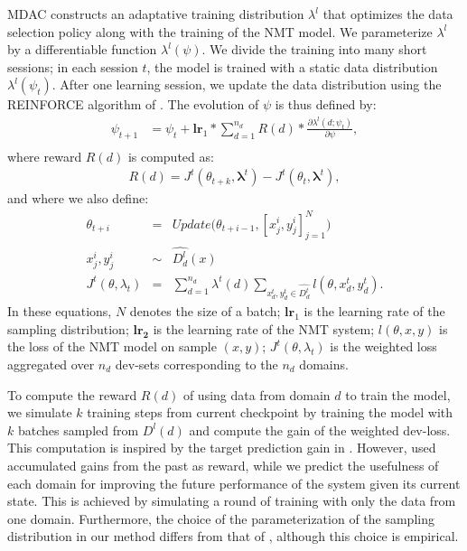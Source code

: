 \documentclass[11pt]{article}
\newcommand{\vlambda}{\ensuremath{\boldsymbol\lambda}\xspace} %
\begin{document}
MDAC constructs an adaptative training distribution $\lambda^{l}$ that optimizes the data selection policy along with the training of the NMT model. We parameterize $\lambda^{l}$ by a differentiable function $\lambda^l(\psi)$. We divide the training into many short sessions; in each session $t$, the model is trained with a static data distribution $\lambda^{l}(\psi_t)$. After one learning session, we update the data distribution using the REINFORCE algorithm of \citet{Williams92simple}. The evolution of $\psi$ is thus defined by:
\begin{align*}
\psi_{t+1} &= \psi_t + \mathbf{lr}_{1} * \displaystyle{\mathop{\sum}_{d=1}^{n_d}} R(d) * \frac{\partial \lambda^l(d;\psi_t)}{\partial \psi}, \\
\end{align*}
\begingroup
\allowdisplaybreaks
where reward $R(d)$ is computed as:
\begin{align*}
  R(d) = J^t(\theta_{t+k},\vlambda^t) - J^t(\theta_t,\vlambda^t),
\end{align*}
and where we also define:
\begin{equation}
\begin{array}{rcl}
\theta_{t+i} &=& Update\big(\theta_{t+i-1},[x^i_j,y^i_j]_{j=1}^N\big) \\ \nonumber
x^i_j, y^i_j &\sim& \widehat{D^l_d}(x) \\
J^t(\theta,\lambda_t) &=& \displaystyle{\mathop{\sum}_{d=1}^{n_d}}\lambda^t(d)\displaystyle{\mathop{\sum}_{x^t_d,y^t_d \in \widehat{D^t_d}}} l(\theta,x^t_d,y^t_d).
\end{array}
\end{equation}
\endgroup
In these equations, $N$ denotes the size of a batch; $\mathbf{lr}_{1}$ is the learning rate of the sampling distribution; $\mathbf{lr_2}$ is the learning rate of the NMT system; $l(\theta,x,y)$ is the loss of the NMT model on sample $(x,y)$; $J^t(\theta,\lambda_t)$ is the weighted loss aggregated over $n_d$ dev-sets corresponding to the $n_d$ domains.

To compute the reward $R(d)$ of using data from domain $d$ to train the model, we simulate $k$ training steps from current checkpoint by training the model with $k$ batches sampled from $D^l(d)$ and compute the gain of the weighted dev-loss. This computation is inspired by the target prediction gain in \citep{Graves17automated}. However, \cite{Graves17automated} used accumulated gains from the past as reward, while we predict the usefulness of each domain for improving the future performance of the system given its current state. This is achieved by simulating a round of training with only the data from one domain. Furthermore, the choice of the parameterization of the sampling distribution in our method differs from that of \citet{Graves17automated}, although this choice is empirical.
\end{document}
